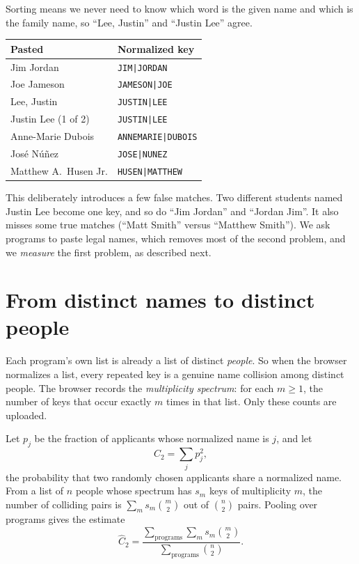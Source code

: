\documentclass[11pt]{article}
\begin{document}
\noindent Sorting means we never need to know which word is the given name and which is the
family name, so ``Lee, Justin'' and ``Justin Lee'' agree.

\begin{center}
\begin{tabular}{@{}ll@{}}
  \toprule
  \textbf{Pasted} & \textbf{Normalized key} \\
  \midrule
  Jim Jordan                 & \texttt{JIM|JORDAN} \\
  Joe Jameson                & \texttt{JAMESON|JOE} \\
  Lee, Justin                & \texttt{JUSTIN|LEE} \\
  Justin Lee (1 of 2)        & \texttt{JUSTIN|LEE} \\
  Anne-Marie Dubois          & \texttt{ANNEMARIE|DUBOIS} \\
  Jos\'e N\'u\~nez           & \texttt{JOSE|NUNEZ} \\
  Matthew A.\ Husen Jr.      & \texttt{HUSEN|MATTHEW} \\
  \bottomrule
\end{tabular}
\end{center}

This deliberately introduces a few false matches. Two different students named Justin Lee become
one key, and so do ``Jim Jordan'' and ``Jordan Jim''. It also misses some true matches (``Matt
Smith'' versus ``Matthew Smith''). We ask programs to paste legal names, which removes most of the
second problem, and we \emph{measure} the first problem, as described next.

\section{From distinct names to distinct people}\label{sec:people}

Each program's own list is already a list of distinct \emph{people}. So when the browser normalizes
a list, every repeated key is a genuine name collision among distinct people. The browser
records the \emph{multiplicity spectrum}: for each $m \ge 1$, the number of keys that occur exactly
$m$ times in that list. Only these counts are uploaded.

Let $p_j$ be the fraction of applicants whose normalized name is $j$, and let
\[
  C_2 = \sum_j p_j^2,
\]
the probability that two randomly chosen applicants share a normalized name. From a list of $n$
people whose spectrum has $s_m$ keys of multiplicity $m$, the number of colliding pairs is
$\sum_m s_m\binom{m}{2}$ out of $\binom{n}{2}$ pairs. Pooling over programs gives the estimate
\[
  \widehat{C}_2 = \frac{\sum_{\text{programs}} \sum_m s_m \binom{m}{2}}{\sum_{\text{programs}} \binom{n}{2}}.
\]
\end{document}
